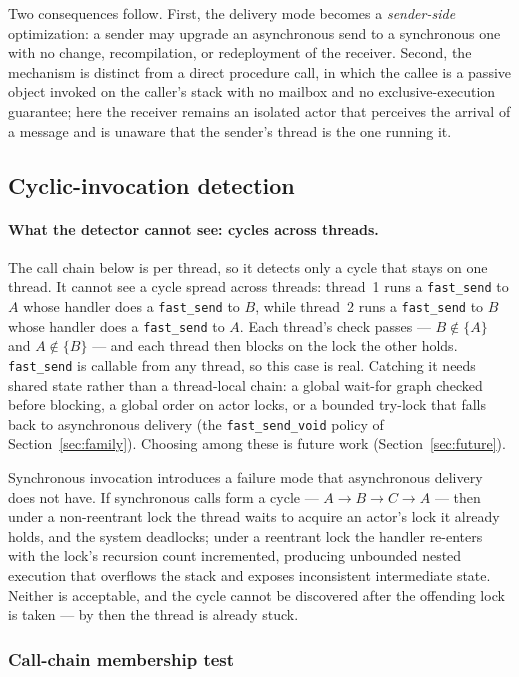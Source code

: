 \documentclass[11pt]{article}
\newcommand{\fs}{\texttt{fast\_send}}
\begin{document}
Two consequences follow. First, the delivery mode becomes a \emph{sender-side}
optimization: a sender may upgrade an asynchronous send to a synchronous one with
no change, recompilation, or redeployment of the receiver. Second, the mechanism
is distinct from a direct procedure call, in which the callee is a passive object
invoked on the caller's stack with no mailbox and no exclusive-execution
guarantee; here the receiver remains an isolated actor that perceives the arrival
of a message and is unaware that the sender's thread is the one running it.

\subsection{Cyclic-invocation detection}
\label{sec:cycle}

\paragraph{What the detector cannot see: cycles across threads.} The call chain below is
per thread, so it detects only a cycle that stays on one thread. It cannot see a
cycle spread across threads: thread~1 runs a \fs{} to $A$ whose handler does a
\fs{} to $B$, while thread~2 runs a \fs{} to $B$ whose handler does a \fs{} to
$A$. Each thread's check passes --- $B \notin \{A\}$ and $A \notin \{B\}$ ---
and each thread then blocks on the lock the other holds. \fs{} is callable from
any thread, so this case is real. Catching it needs shared state rather than a
thread-local chain: a global wait-for graph checked before blocking, a global
order on actor locks, or a bounded try-lock that falls back to asynchronous
delivery (the \texttt{fast\_send\_void} policy of Section~\ref{sec:family}).
Choosing among these is future work (Section~\ref{sec:future}).

Synchronous invocation introduces a failure mode that asynchronous delivery does
not have. If synchronous calls form a cycle --- $A \to B \to C \to A$ --- then
under a non-reentrant lock the thread waits to acquire an actor's lock it already
holds, and the system deadlocks; under a reentrant lock the handler re-enters
with the lock's recursion count incremented, producing unbounded nested
execution that overflows the stack and exposes inconsistent intermediate state.
Neither is acceptable, and the cycle cannot be discovered after the offending
lock is taken --- by then the thread is already stuck.

\subsubsection{Call-chain membership test}
\end{document}
